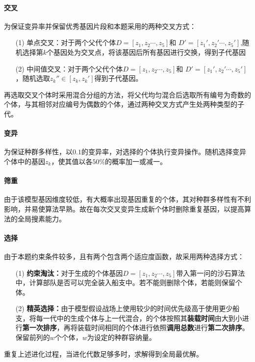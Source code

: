 \documentclass{whutmod}
\begin{document}
	 \paragraph{交叉}
	 为保证变异率并保留优秀基因片段和本题采用的两种交叉方式：
	\begin{itemize}
	\item [(1)]单点交叉：对于两个父代个体$D=[z_{1},z_{2}\cdots,z_{5}]$和	$D'=[z_{1}',z_{2}'\cdots,z_{5}']$,随机选择第$k$个基因处为交叉点，将该基因后所有基因进行交换，得到子代基因
	\item [(2)]中间值交叉：对于两个父代个体$D=[z_{1},z_{2}\cdots,z_{5}]$和	$D'=[z_{1}',z_{2}'\cdots,z_{5}']$，随机选取$z_{k}''\in [z_{k},z_{k}']$得到子代基因。
    \end{itemize}
    再选取交叉个体时采用混合分组的方法，将父代均匀混合后选取所有编号为奇数的个体，与其相邻对应编号为偶数的个体，通过两种交叉方式产生处两种类型的子代。
     \paragraph{变异}
     为保证种群多样性，以$0.1$的变异率，对选择的个体执行变异操作。随机选择变异个体中的基因$z_{k}$，使其值以各$50\%$的概率加一或减一。
     \paragraph{筛重}
     由于该模型基因维度较低，有大概率出现基因重复的个体，其对种群多样性有不利影响，并易使算法早熟。故在每次交叉变异生成新个体时删除重复基因，以提高算法的全局搜素能力。
     \paragraph{选择}
     由于本题约束条件较多，且有两个包含两个适应度函数，故采用两种选择方式：
     \begin{itemize}
     \item [(1)] \textbf{约束淘汰：}对于生成的个体基因$D=[z_{1},z_{2}\cdots,z_{5}]$带入第一问的沙石算法中，计算部队是否可以完全装入船支中。若不能则删除个体，若能则保留个体。
     \item [(2)]\textbf{精英选择：}由于模型假设战场上使用较少的时间优先级高于使用更少船支，将每一代中的生成个体与上一代混合，的个体按照其\textbf{装载时间}由大到小进行\textbf{第一次排序}，再将装载时间相同的个体进行依照\textbf{调用总数}进行\textbf{第二次排序}。保留前列的$w$个个体，$w$为设定的种群容纳量。
     \end{itemize}
     重复上述进化过程，当进化代数足够多时，求解得到全局最优解。
\end{document}
